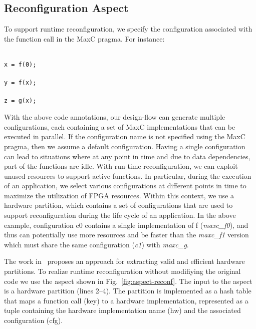 \subsection{Reconfiguration Aspect}
\label{sect:asp_reconfig}
To support runtime reconfiguration, we specify the configuration associated with the function call in the MaxC pragma. For instance:

\noindent\texttt{\footnotesize{\\
x = f(0); \\
\\
y = f(x); \\
\\
z = g(x); \\
}}

\noindent With the above code annotations, our design-flow can generate multiple configurations, each containing a set of MaxC implementations that can be executed in parallel. If the configuration name is not specified using the MaxC pragma, then we assume a default configuration. Having a single configuration can lead to situations where at any point in time and due to data dependencies, part of the functions are idle. With run-time reconfiguration, we can exploit unused resources to support active functions. In particular, during the execution of an application, we select various configurations at different points in time to maximize the utilization of FPGA resources. Within this context, we use a hardware partition, which contains a set of configurations that are used to support reconfiguration during the life cycle of an application. In the above example, configuration c0 contains a single implementation of f (\emph{maxc\_f0}), and thus can potentially use more resources and be faster than the \emph{maxc\_f1} version which must share the same configuration (\emph{c1}) with \emph{maxc\_g}.

The work in~\cite{Xinyu:Qiwei:Luk:Qiang:Pell:2012} proposes an
approach for extracting valid and efficient hardware partitions. To realize
runtime reconfiguration without modifiying the original code we use the
aspect shown in Fig.~\ref{fig:aspect-reconf}.  The input to the
aspect is a hardware partition (lines 2--4). The partition is implemented as a
hash table that maps a function call (key) to a hardware
implementation, represented as a tuple containing the hardware
implementation name (hw) and the associated configuration (cfg).

